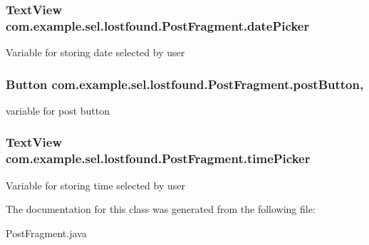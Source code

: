 \subsubsection[{\texorpdfstring{date\+Picker}{datePicker}}]{\setlength{\rightskip}{0pt plus 5cm}Text\+View com.\+example.\+sel.\+lostfound.\+Post\+Fragment.\+date\+Picker\hspace{0.3cm}{\ttfamily [static]}}\hypertarget{classcom_1_1example_1_1sel_1_1lostfound_1_1PostFragment_a1c187b07da5262cf568439018a826ef9}{}\label{classcom_1_1example_1_1sel_1_1lostfound_1_1PostFragment_a1c187b07da5262cf568439018a826ef9}
Variable for storing date selected by user 
\subsubsection[{\texorpdfstring{post\+Button}{postButton}}]{\setlength{\rightskip}{0pt plus 5cm}Button com.\+example.\+sel.\+lostfound.\+Post\+Fragment.\+post\+Button\hspace{0.3cm}{\ttfamily [static]}, {\ttfamily [protected]}}\hypertarget{classcom_1_1example_1_1sel_1_1lostfound_1_1PostFragment_ab2d93225b515c22ccd209e1382e1a4a1}{}\label{classcom_1_1example_1_1sel_1_1lostfound_1_1PostFragment_ab2d93225b515c22ccd209e1382e1a4a1}
variable for post button 
\subsubsection[{\texorpdfstring{time\+Picker}{timePicker}}]{\setlength{\rightskip}{0pt plus 5cm}Text\+View com.\+example.\+sel.\+lostfound.\+Post\+Fragment.\+time\+Picker\hspace{0.3cm}{\ttfamily [static]}}\hypertarget{classcom_1_1example_1_1sel_1_1lostfound_1_1PostFragment_ac6d98a5b689bea76cf1248a20a54d23c}{}\label{classcom_1_1example_1_1sel_1_1lostfound_1_1PostFragment_ac6d98a5b689bea76cf1248a20a54d23c}
Variable for storing time selected by user 

The documentation for this class was generated from the following file\+:\begin{DoxyCompactItemize}
\item 
Post\+Fragment.\+java\end{DoxyCompactItemize}
